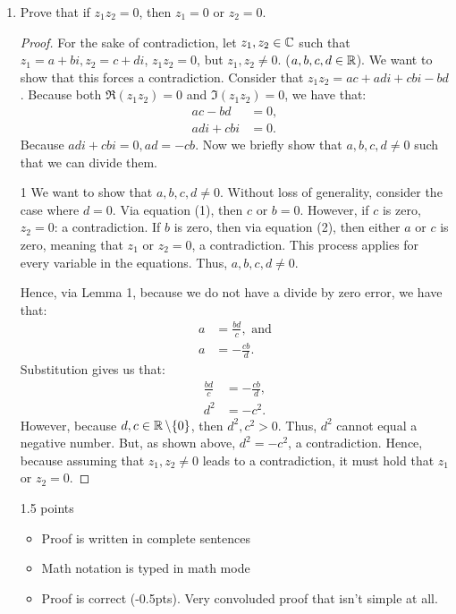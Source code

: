 \begin{enumerate}
	\item Prove that if $z_1 z_2 = 0$, then $z_1=0$ or $z_2=0$.
    \begin{proof}
        For the sake of contradiction, let $z_1,z_2\in \mathbb{C}$ such that $z_1 = a +bi, z_2=c+di$, $z_1z_2 = 0$, but $z_1,z_2\ne 0$. ($a,b,c,d\in\mathbb{R}$).\gline{}
        We want to show that this forces a contradiction.\gline{}
        Consider that $z_1z_2 = ac + adi + cbi - bd$. Because both $\Re(z_1z_2) = 0$ and $\Im(z_1z_2)=0$, we have that:
        \begin{align}
            ac - bd &= 0,\\
            adi + cbi &= 0.
        \end{align} 
        Because $adi + cbi = 0, ad = -cb$. Now we briefly show that $a,b,c,d \ne0$ such that we can divide them.\gline{}
        \begin{lemma}{1}
            We want to show that $a,b,c,d \ne 0$. \gline{}
            Without loss of generality, consider the case where $d =0$. Via equation (1), then $c$ or $b= 0$.\gline{}
            However, if $c$ is zero, $z_2 = 0$: a contradiction. \gline{}
            If $b$ is zero, then via equation (2), then either $a$ or $c$ is zero, meaning that $z_1$ or $z_2=0$, a contradiction.\gline{}
            This process applies for every variable in the equations. Thus, $a,b,c,d \ne 0$. 
        \end{lemma}
        Hence, via Lemma 1, because we do not have a divide by zero error, we have that:
        \begin{align*}
            a &= \frac{bd}c, \text{ and}\\
            a &= -\frac{cb}d.
        \end{align*}
        Substitution gives us that:
        \begin{align*}
            \frac{bd}c &= -\frac{cb}d,\\
            d^2 &= -c^2.
        \end{align*}
        However, because $d, c\in\R\rmv{0}$, then $d^2, c^2 > 0$. Thus, $d^2$ cannot equal a negative number. But, as shown above, $d^2 = -c^2$, a contradiction.\gline{}
        Hence, because assuming that $z_1, z_2\ne 0$ leads to a contradiction, it must hold that $z_1$ or $z_2=0$.
    \end{proof}
    \begin{grade}
        1.5 points
        \begin{itemize}[itemsep=0pt, parsep=0pt]
            \item Proof is written in complete sentences
            \item Math notation is typed in math mode
            \item Proof is correct (-0.5pts). Very convoluded proof that isn't simple at all. 
        \end{itemize}
    \end{grade}



\end{enumerate}
